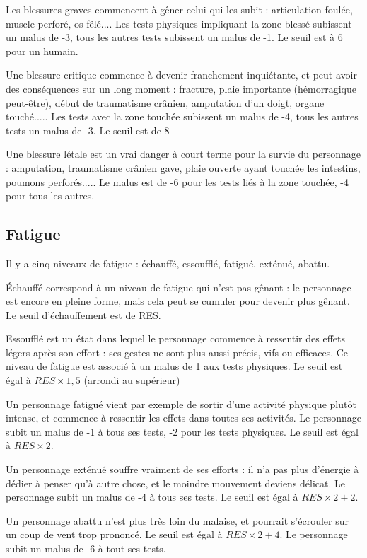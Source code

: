 \documentclass[10pt,a4paper,twocolumn]{book}
\begin{document}
Les blessures graves commencent à gêner celui qui les subit : articulation foulée, muscle perforé, os fêlé.... Les tests physiques impliquant la zone blessé subissent un malus de -3, tous les autres tests subissent un malus de -1. Le seuil est à 6 pour un humain.

Une blessure critique commence à devenir franchement inquiétante, et peut avoir des conséquences sur un long moment : fracture, plaie importante (hémorragique peut-être), début de traumatisme crânien, amputation d'un doigt, organe touché..... Les tests avec la zone touchée subissent un malus de -4, tous les autres tests un malus de -3. Le seuil est de 8

Une blessure létale est un vrai danger à court terme pour la survie du personnage : amputation, traumatisme crânien gave, plaie ouverte ayant touchée les intestins, poumons perforés..... Le malus est de -6 pour les tests liés à la zone touchée, -4 pour tous les autres.

\subsection{Fatigue}
Il y a cinq niveaux de fatigue : échauffé, essoufflé, fatigué, exténué, abattu.

Échauffé correspond à un niveau de fatigue qui n'est pas gênant : le personnage est encore en pleine forme, mais cela peut se cumuler pour devenir plus gênant. Le seuil d'échauffement est de RES.

Essoufflé est un état dans lequel le personnage commence à ressentir des effets légers après son effort : ses gestes ne sont plus aussi précis, vifs ou efficaces. Ce niveau de fatigue est associé à un malus de 1 aux tests physiques. Le seuil est égal à $RES\times 1,5$ (arrondi au supérieur)

Un personnage fatigué vient par exemple de sortir d'une activité physique plutôt intense, et commence à ressentir les effets dans toutes ses activités. Le personnage subit un malus de -1 à tous ses tests, -2 pour les tests physiques. Le seuil est égal à $RES\times 2$.

Un personnage exténué souffre vraiment de ses efforts : il n'a pas plus d'énergie à dédier à penser qu'à autre chose, et le moindre mouvement deviens délicat. Le personnage subit un malus de -4 à tous ses tests. Le seuil est égal à $RES\times 2+2$.

Un personnage abattu n'est plus très loin du malaise, et pourrait s'écrouler sur un coup de vent trop prononcé. Le seuil est égal à $RES\times 2+4$. Le personnage subit un malus de -6 à tout ses tests.
\end{document}
